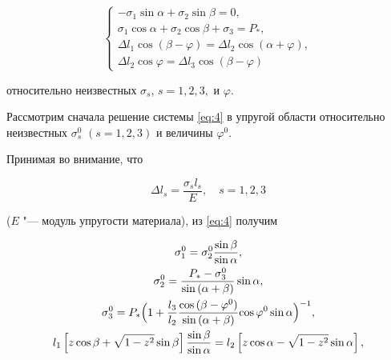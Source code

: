 \begin{equation}

\label{eq:4}

\begin{cases}

-\sigma_1 \sin{\alpha} + \sigma_2 \sin{\beta} = 0,\\

\sigma_1 \cos{\alpha} + \sigma_2 \cos{\beta} + \sigma_3 = P_\ast, \\

\Delta l_1 \cos{(\beta-\varphi)} = \Delta l_2 \cos{(\alpha+\varphi)}, \\

\Delta l_2 \cos{\varphi} = \Delta l_3 \cos{(\beta-\varphi)}

\end{cases}

\end{equation}

относительно неизвестных $\sigma_s$, $s=1,2,3,$ и $\varphi$.



Рассмотрим сначала решение системы \eqref{eq:4} в упругой области относительно неизвестных $\sigma_s^0$ $(s=1,2,3)$ и величины $\varphi^0$.

Принимая во внимание, что

\begin{equation}

\label{eq:5}

\Delta l_s = \frac{\sigma_s l_s}{E},\quad  s=1,2,3 

\end{equation}

($E$ "--- модуль упругости материала), из \eqref{eq:4} получим

\begin{gather}

\label{eq:6}

\sigma_{1}^{0} = \sigma_{2}^{0} \frac{\sin{\beta}}{\sin{\alpha}},

\\

\label{eq:7}

\sigma_{2}^{0} = \frac{P_\ast - \sigma_{3}^{0}}{\sin{(\alpha+\beta})} \sin{\alpha},

\\

\label{eq:8}

\sigma_{3}^{0} = P_\ast \Bigl(1+\frac{l_3}{l_2} \frac{\cos{(\beta - \varphi^{0})}} {\sin{(\alpha + \beta)}}{\cos{\varphi^{0}} \sin{\alpha}}\Bigr)^{-1},

\\

\label{eq:9}

l_1 \left[ z \cos{\beta} + \sqrt{1-z^2} \sin{\beta}  \right] \frac{\sin{\beta}}{\sin{\alpha}} = l_2 \left[ z \cos{\alpha} - \sqrt{1-z^2} \sin{\alpha} \right],

\end{gather}

